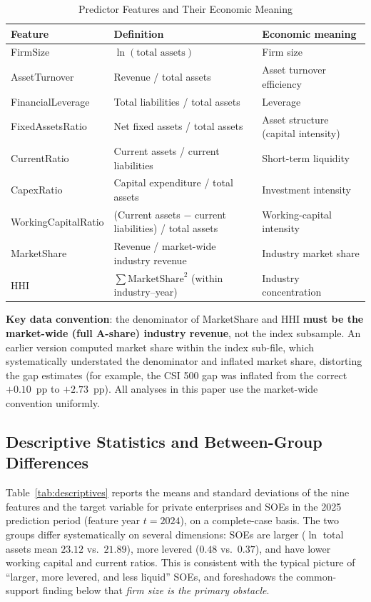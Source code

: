 \documentclass[11pt,a4paper]{article}
\begin{document}
\begin{table}[htbp]
\centering
\caption{Predictor Features and Their Economic Meaning}
\label{tab:features}
\begin{threeparttable}
\small
\begin{tabularx}{\linewidth}{l >{\raggedright\arraybackslash}X >{\raggedright\arraybackslash}X}
\toprule
Feature & Definition & Economic meaning \\
\midrule
FirmSize & $\ln(\text{total assets})$ & Firm size \\
AssetTurnover & Revenue / total assets & Asset turnover efficiency \\
FinancialLeverage & Total liabilities / total assets & Leverage \\
FixedAssetsRatio & Net fixed assets / total assets & Asset structure (capital intensity) \\
CurrentRatio & Current assets / current liabilities & Short-term liquidity \\
CapexRatio & Capital expenditure / total assets & Investment intensity \\
WorkingCapitalRatio & (Current assets $-$ current liabilities) / total assets & Working-capital intensity \\
MarketShare & Revenue / market-wide industry revenue & Industry market share \\
HHI & $\sum \text{MarketShare}^2$ (within industry--year) & Industry concentration \\
\bottomrule
\end{tabularx}
\end{threeparttable}
\end{table}

\textbf{Key data convention}: the denominator of MarketShare and HHI \textbf{must be the market-wide (full A-share) industry revenue}, not the index subsample. An earlier version computed market share within the index sub-file, which systematically understated the denominator and inflated market share, distorting the gap estimates (for example, the CSI 500 gap was inflated from the correct $+0.10$~pp to $+2.73$~pp). All analyses in this paper use the market-wide convention uniformly.

\subsection{Descriptive Statistics and Between-Group Differences}

Table~\ref{tab:descriptives} reports the means and standard deviations of the nine features and the target variable for private enterprises and SOEs in the 2025 prediction period (feature year $t=2024$), on a complete-case basis. The two groups differ systematically on several dimensions: SOEs are larger ($\ln$ total assets mean $23.12$ vs.\ $21.89$), more levered ($0.48$ vs.\ $0.37$), and have lower working capital and current ratios. This is consistent with the typical picture of ``larger, more levered, and less liquid'' SOEs, and foreshadows the common-support finding below that \emph{firm size is the primary obstacle}.
\end{document}
